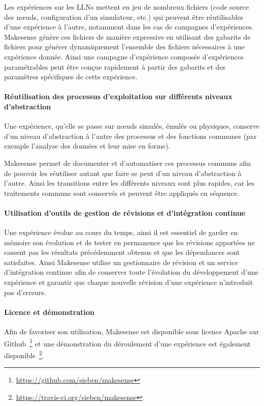 Les expériences sur les \ac{LLN}s mettent en jeu de nombreux fichiers (code source des nœuds, configuration d'un simulateur, etc.) qui peuvent être réutilisables d'une expérience à l'autre, notamment dans les cas de campagnes d'expériences.
Makesense génère ces fichiers de manière expressive en utilisant des gabarits de fichiers pour générer dynamiquement l'ensemble des fichiers nécessaires à une expérience donnée.
Ainsi une campagne d'expérience composée d'expériences paramétrables peut être conçue rapidement à partir des gabarits et des paramètres spécifiques de cette expérience.

\paragraph{Réutilisation des processus d'exploitation sur différents niveaux d'abstraction}

Une expérience, qu'elle se passe sur nœuds simulés, émulés ou physiques, conserve d'un niveau d'abstraction à l'autre des processus et des fonctions communes (par exemple l'analyse des données et leur mise en forme).

Makesense permet de documenter et d'automatiser ces processus communs afin de pouvoir les réutiliser autant que faire se peut d'un niveau d'abstraction à l'autre.
Ainsi les transitions entre les différents niveaux sont plus rapides, car les traitements communs sont conservés et peuvent être appliqués en séquence.

\paragraph{Utilisation d'outils de gestion de révisions et d'intégration continue}

Une expérience évolue au cours du temps, ainsi il est essentiel de garder en mémoire son évolution et de tester en permanence que les révisions apportées ne cassent pas les résultats précédemment obtenus et que les dépendances sont satisfaites.
Ainsi Makesense utilise un gestionnaire de révision et un service d'intégration continue afin de conserver toute l'évolution du développement d'une expérience et garantir que chaque nouvelle révision d'une expérience n'introduit pas d'erreurs.

\paragraph{Licence et démonstration}

Afin de favoriser son utilisation, Makesense est disponible sous licence Apache sur Github~\footnote{\href{https://github.com/sieben/makesense}{https://github.com/sieben/makesense}} et une démonstration du déroulement d'une expérience est également disponible~\footnote{\href{https://travis-ci.org/sieben/makesense}{https://travis-ci.org/sieben/makesense}}.

